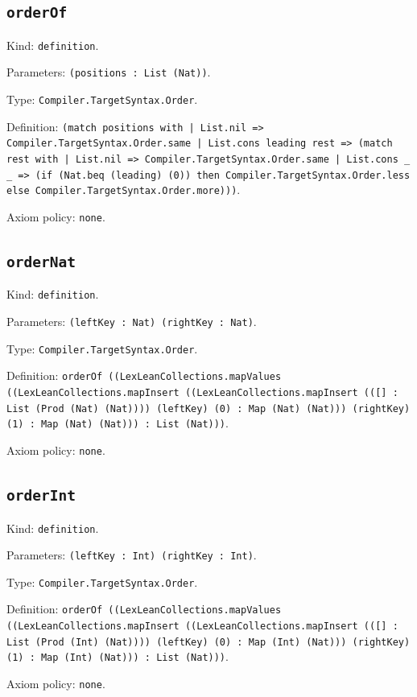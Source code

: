 \documentclass[11pt]{article}
\begin{document}
\subsection*{\texttt{orderOf}}
\noindent Kind: \texttt{definition}.\par
\noindent Parameters: \texttt{(positions : List (Nat))}.\par
\noindent Type: \texttt{Compiler.TargetSyntax.Order}.\par
\noindent Definition: \texttt{(match positions with | List.nil => Compiler.TargetSyntax.Order.same | List.cons leading rest => (match rest with | List.nil => Compiler.TargetSyntax.Order.same | List.cons \_ \_ => (if (Nat.beq (leading) (0)) then Compiler.TargetSyntax.Order.less else Compiler.TargetSyntax.Order.more)))}.\par
\noindent Axiom policy: \texttt{none}.\par
\subsection*{\texttt{orderNat}}
\noindent Kind: \texttt{definition}.\par
\noindent Parameters: \texttt{(leftKey : Nat) (rightKey : Nat)}.\par
\noindent Type: \texttt{Compiler.TargetSyntax.Order}.\par
\noindent Definition: \texttt{orderOf ((LexLeanCollections.mapValues ((LexLeanCollections.mapInsert ((LexLeanCollections.mapInsert (([] : List (Prod (Nat) (Nat)))) (leftKey) (0) : Map (Nat) (Nat))) (rightKey) (1) : Map (Nat) (Nat))) : List (Nat)))}.\par
\noindent Axiom policy: \texttt{none}.\par
\subsection*{\texttt{orderInt}}
\noindent Kind: \texttt{definition}.\par
\noindent Parameters: \texttt{(leftKey : Int) (rightKey : Int)}.\par
\noindent Type: \texttt{Compiler.TargetSyntax.Order}.\par
\noindent Definition: \texttt{orderOf ((LexLeanCollections.mapValues ((LexLeanCollections.mapInsert ((LexLeanCollections.mapInsert (([] : List (Prod (Int) (Nat)))) (leftKey) (0) : Map (Int) (Nat))) (rightKey) (1) : Map (Int) (Nat))) : List (Nat)))}.\par
\noindent Axiom policy: \texttt{none}.\par
\end{document}
